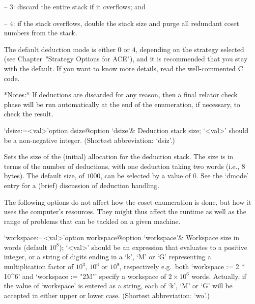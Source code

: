 \item{--} $3$:
discard the entire stack if it overflows; and

\item{--} $4$:
if the stack overflows, double the stack size and purge all  redundant
coset numbers from the stack.

\endlist

The default deduction mode is either $0$  or  $4$,  depending  on  the
strategy selected (see Chapter~"Strategy Options for ACE"), and it  is
recommended that you stay with the default. If you want to  know  more
details, read the well-commented C code.

*Notes:*
If deductions are discarded for any reason, then a final relator check
phase  will be run  automatically at  the end  of the  enumeration, if
necessary, to check the result.

\>`dsize:=<val>'{option dsize}@{option `dsize'}&
Deduction stack size; `<val>' should be a non-negative integer.
(Shortest abbreviation: `dsiz'.)

Sets the  size of  the (initial) allocation  for the  deduction stack.
The size is  in terms of the number of  deductions, with one deduction
taking two words (i.e., 8 bytes).  The default size, of $1000$, can be
selected  by  a value  of  0.   See the  `dmode' entry  for a  (brief)
discussion of deduction handling.

\enditems


The following options do not affect how the coset enumeration is done,
but how it  uses the computer's resources. They  might thus affect the
runtime as  well as  the range of  problems that  can be tackled  on a
given machine.

\beginitems

\>`workspace:=<val>'{option workspace}@{option `workspace'}&
Workspace size in words (default $10^8$);
`<val>' should be an expression that evaluates to a positive  integer,
or a string of digits ending in a  `k',  `M'  or  `G'  representing  a
multiplication  factor  of  $10^3$,  $10^6$  or  $10^9$,  respectively
e.g.~both `workspace := 2 * 10^6' and `workspace :=  "2M"'  specify  a
workspace  of  $2\times10^6$  words.  Actually,  if   the   value   of
`workspace' is entered as a string, each of `k', `M' or  `G'  will  be
accepted in either upper or lower case. (Shortest abbreviation: `wo'.)

